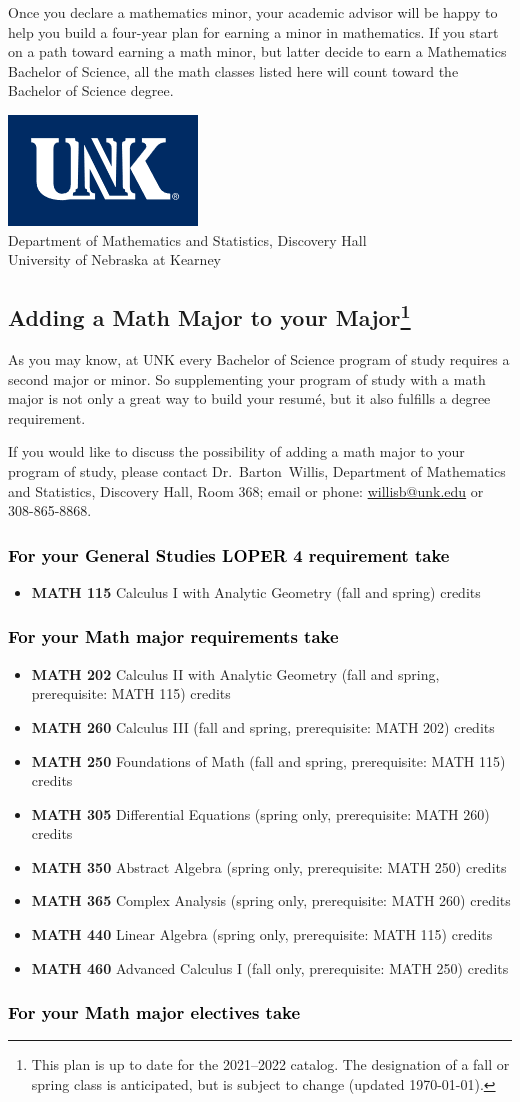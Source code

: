 \documentclass[10pt]{article}
\makeatletter
\newcommand{\calcone}{\textbf{MATH 115} Calculus I with Analytic Geometry (fall and spring) \dotfill 5 credits}
\newcommand{\calctwo}{\textbf{MATH 202} Calculus II with Analytic Geometry (fall and spring, prerequisite: MATH 115) \dotfill 5 credits }
\newcommand{\foundations}{\textbf{MATH 250} Foundations of Math (fall and spring, prerequisite: MATH 115)  \dotfill 3 credits}
\newcommand{\calcthree}{\textbf{MATH 260} Calculus III  (fall and spring, prerequisite: MATH 202) \dotfill 5 credits}
\newcommand{\linear}{\textbf{MATH 440} Linear Algebra (spring only, prerequisite: MATH 115) \dotfill 3 credits}
\newcommand{\diffeq}{\textbf{MATH 305}	Differential Equations (spring only, prerequisite: MATH 260) \dotfill 	3 credits}
\newcommand{\abstractalgebra}{\textbf{MATH 350}	Abstract Algebra (spring only, prerequisite: MATH 250) \dotfill 	3 credits}
\newcommand{\complex}{\textbf{MATH 365}	Complex Analysis (spring only,  prerequisite: MATH 260) \dotfill 3 credits}
\newcommand{\advancedcalc}{\textbf{MATH 460}	Advanced Calculus I  (fall only,   prerequisite: MATH 250) \dotfill 3 credits}
\newcommand{\contactbw}{\mbox{Dr.\ Barton Willis}, Department of Mathematics and Statistics,  Discovery Hall, Room 368;
email or phone: \href{mailto:willisb@unk.edu}{willisb@unk.edu} or 308-865-8868.}
\newcommand{\forinfo}[2]{If you would like to discuss the possibility of adding a math {#1} to your {#2}, please contact \contactbw}
\newcommand{\catalog}{2021--2022 }
\newcommand{\myfootnote}{\footnote{This plan is up to date for  the \catalog catalog. The designation of a fall or spring class is 
anticipated, but  is subject to change (updated  \today).}}
\newcommand{\myheading}{
\begin{flushleft}
\includegraphics[scale=0.35]{unk-logo}\\
\setcounter{footnote}{0}
\vspace{0.25in}
 \textcolor{unkblue}{Department of Mathematics and Statistics, Discovery Hall} \\
  \textcolor{unkblue}{University of Nebraska at Kearney}
\end{flushleft}}
\makeatother
\begin{document}
 \noindent Once you declare a mathematics minor, your academic advisor will be happy to help you build a four-year plan for earning a minor in mathematics.  If you start on a path toward earning a math minor, but latter decide to earn a  Mathematics Bachelor of Science, all the math classes listed here will count toward the Bachelor of Science degree.

   \vspace{0.1in}

\newpage

\myheading


\subsection*{\textbf{\textcolor{unkblue}{Adding a Math Major to your Major\myfootnote}}}

As you may know, at UNK every Bachelor of Science program of study requires a second
major or minor. So supplementing your  program of study with a math major is not only a great
way to build your resum\'e, but it also fulfills a degree requirement.


\forinfo{major}{program of study}

\subsubsection*{\textcolor{black}{For your General Studies LOPER 4 requirement take}}
\begin{itemize}
\item \calcone
\end{itemize}


\subsubsection*{\textcolor{black}{For your Math major requirements take}}
\begin{itemize}
  \item \calctwo
  \item \calcthree
\item \foundations
\item \diffeq
\item \abstractalgebra
\item \complex
\item \linear
\item \advancedcalc
\end{itemize}

\subsubsection*{\textcolor{black}{For your Math major electives take}}
\end{document}
